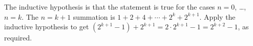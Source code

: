 \documentclass{test}  %
\begin{document}
\begin{problem}
\begin{exes}
\begin{answer}
The inductive hypothesis is that 
the statement is true for the cases $n=0$, \ldots, $n=k$.
The $n=k+1$ summation is
$1+2+4+\cdots+2^k+2^{k+1}$. 
Apply the inductive hypothesis to get
$(2^{k+1}-1)+2^{k+1}=2\cdot 2^{k+1}-1=2^{k+2}-1$, as required. 
\end{answer}
\end{exes}




\end{problem}
\end{document}
